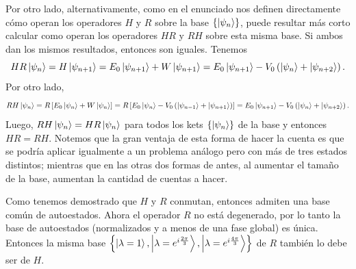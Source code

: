 \documentclass[10pt, a4paper]{article}
\numberwithin{equation}{subsection}
\begin{document}
Por otro lado, alternativamente, como en el enunciado nos definen directamente
cómo operan los operadores $H$ y $R$ sobre la base $\set{\ket{\psi_n}}$, puede
resultar más corto calcular como operan los operadores $HR$ y $RH$ sobre esta
misma base. Si ambos dan los mismos resultados, entonces son iguales. Tenemos
\begin{equation}
  HR\ket{\psi_n} = H\ket{\psi_{n+1}} = E_0\ket{\psi_{n+1}} + W\ket{\psi_{n+1}}
    =  E_0\ket{\psi_{n+1}} - V_0\left(\ket{\psi_{n}} + \ket{\psi_{n+2}}\right).
\end{equation}
Por otro lado,
\begin{equation}
  RH\ket{\psi_n} = R\left[E_0\ket{\psi_{n}} + W\ket{\psi_{n}}\right] =
  R\left[E_0\ket{\psi_{n}} - V_0\left(\ket{\psi_{n-1}} +
    \ket{\psi_{n+1}}\right)\right] =
  E_0\ket{\psi_{n+1}} - V_0\left(\ket{\psi_{n}} + \ket{\psi_{n+2}}\right).
\end{equation}
Luego, $RH\ket{\psi_n} = HR\ket{\psi_n}$ para todos los kets
$\set{\ket{\psi_n}}$ de la base y entonces $HR = RH$. Notemos que la gran
ventaja de esta forma de hacer la cuenta es que se podría aplicar igualmente a
un problema análogo pero con más de tres estados distintos; mientras que en las
otras dos formas de antes, al aumentar el tamaño de la base, aumentan la
cantidad de cuentas a hacer.

Como tenemos demostrado que $H$ y $R$ conmutan, entonces admiten una base
común de autoestados. Ahora el operador $R$ no está degenerado, por lo tanto la
base de autoestados (normalizados y a menos de una fase global) es única.
Entonces la misma base $\set{\ket{\lambda = 1}, \ket{\lambda =
e^{i\frac{2\pi}{3}}}, \ket{\lambda = e^{i\frac{4\pi}{3}}}}$ de $R$ también lo
debe ser de $H$.
\end{document}
